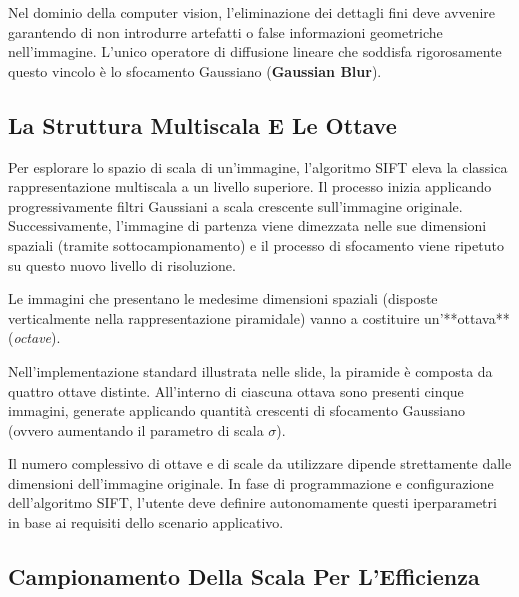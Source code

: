 ﻿\documentclass[11pt, a4paper]{article}
\begin{document}
Nel dominio della computer vision, l'eliminazione dei dettagli fini deve avvenire garantendo di non introdurre artefatti o false informazioni geometriche nell'immagine. L'unico operatore di diffusione lineare che soddisfa rigorosamente questo vincolo è lo sfocamento Gaussiano (\textbf{Gaussian Blur}).

\subsection{La Struttura Multiscala E Le Ottave}

Per esplorare lo spazio di scala di un'immagine, l'algoritmo SIFT eleva la classica rappresentazione multiscala a un livello superiore. Il processo inizia applicando progressivamente filtri Gaussiani a scala crescente sull'immagine originale. Successivamente, l'immagine di partenza viene dimezzata nelle sue dimensioni spaziali (tramite sottocampionamento) e il processo di sfocamento viene ripetuto su questo nuovo livello di risoluzione.



Le immagini che presentano le medesime dimensioni spaziali (disposte verticalmente nella rappresentazione piramidale) vanno a costituire un'**ottava** (\emph{octave}).


Nell'implementazione standard illustrata nelle slide, la piramide è composta da quattro ottave distinte. All'interno di ciascuna ottava sono presenti cinque immagini, generate applicando quantità crescenti di sfocamento Gaussiano (ovvero aumentando il parametro di scala $\sigma$).

Il numero complessivo di ottave e di scale da utilizzare dipende strettamente dalle dimensioni dell'immagine originale. In fase di programmazione e configurazione dell'algoritmo SIFT, l'utente deve definire autonomamente questi iperparametri in base ai requisiti dello scenario applicativo.

\subsection{Campionamento Della Scala Per L'Efficienza}
\end{document}
